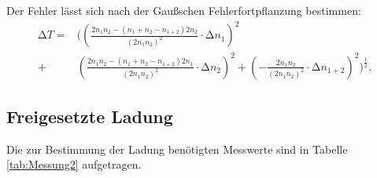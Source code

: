 Der Fehler lässt sich nach der Gaußschen Fehlerfortpflanzung bestimmen:
\begin{equation*}
  \begin{split}
  \increment T = & \biggl(\left(\frac{2n_1n_2 - (n_1+n_2-n_{1+2})2n_2}{(2n_1n_2)^2}\cdot \increment n_1 \right)^2 \\
  + & \left(\frac{2n_1n_2 - (n_1+n_2-n_{1+2})2n_1}{(2n_1n_2)^2} \cdot \increment n_2\right)^2  +  \left(-\frac{2n_1n_2}{(2n_1n_2)^2} \cdot \increment n_{1+2}\right)^2\biggr)^{\frac{1}{2}}.
  \end{split}
\end{equation*}

\subsection{Freigesetzte Ladung}
Die zur Bestimmung der Ladung benötigten Messwerte sind in Tabelle \ref{tab:Messung2} aufgetragen. 


